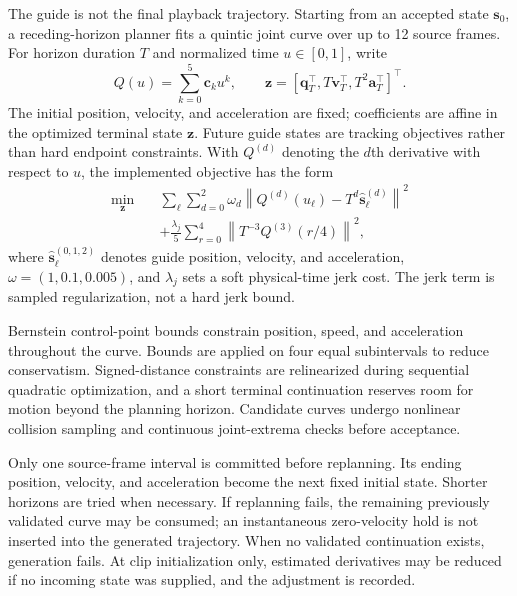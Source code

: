 \documentclass[conference]{IEEEtran}
\newcommand{\vect}[1]{\boldsymbol{#1}}
\begin{document}
The guide is not the final playback trajectory. Starting from an accepted
state $\vect{s}_0$, a receding-horizon planner fits a quintic joint curve over
up to 12 source frames. For horizon duration $T$ and normalized time
$u\in[0,1]$, write
\begin{equation}
Q(u)=\sum_{k=0}^{5}\vect{c}_k u^k,\qquad
\vect{z}=[\vect{q}_T^\top,T\vect{v}_T^\top,T^2\vect{a}_T^\top]^\top.
\end{equation}
The initial position, velocity, and acceleration are fixed; coefficients are
affine in the optimized terminal state $\vect{z}$. Future guide states are
tracking objectives rather than hard endpoint constraints. With $Q^{(d)}$
denoting the $d$th derivative with respect to $u$, the implemented objective
has the form
\begin{equation}
\begin{split}
\min_{\vect{z}}\quad
&\sum_{\ell}\sum_{d=0}^{2}\omega_d
\left\|Q^{(d)}(u_\ell)-T^d\hat{\vect{s}}_{\ell}^{(d)}\right\|^2\\
&+\frac{\lambda_j}{5}\sum_{r=0}^{4}
\left\|T^{-3}Q^{(3)}(r/4)\right\|^2,
\end{split}
\label{eq:offline-objective}
\end{equation}
where $\hat{\vect{s}}_{\ell}^{(0,1,2)}$ denotes guide position, velocity, and
acceleration, $\omega=(1,0.1,0.005)$, and $\lambda_j$ sets a soft physical-time
jerk cost. The jerk term is sampled regularization, not a hard jerk bound.

Bernstein control-point bounds constrain position, speed, and acceleration
throughout the curve. Bounds are applied on four equal subintervals to reduce
conservatism. Signed-distance constraints are relinearized during sequential
quadratic optimization, and a short terminal continuation reserves room for
motion beyond the planning horizon. Candidate curves undergo nonlinear
collision sampling and continuous joint-extrema checks before acceptance.

Only one source-frame interval is committed before replanning. Its ending
position, velocity, and acceleration become the next fixed initial state.
Shorter horizons are tried when necessary. If replanning fails, the remaining
previously validated curve may be consumed; an instantaneous zero-velocity
hold is not inserted into the generated trajectory. When no validated
continuation exists, generation fails. At clip initialization only, estimated
derivatives may be reduced if no incoming state was supplied, and the
adjustment is recorded.
\end{document}
